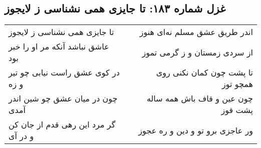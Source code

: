 \begin{center}
\section*{غزل شماره ۱۸۳: تا جایزی همی نشناسی ز لایجوز}
\label{sec:183}
\begin{longtable}{l p{0.5cm} r}
تا جایزی همی نشناسی ز لایجوز
&&
اندر طریق عشق مسلم نه‌ای هنوز
\\
عاشق نباشد آنکه مر او را خبر بود
&&
از سردی زمستان و ز گرمی تموز
\\
در کوی عشق راست نیابی چو تیر و زه
&&
تا پشت چون کمان نکنی روی همچو توز
\\
چون در میان عشق چو شین اندر آمدی
&&
چون عین و قاف باش همه ساله پشت قوز
\\
گر مرد این رهی قدم از جان کن و در آی
&&
ور عاجزی برو تو و دین و ره عجوز
\\
\end{longtable}
\end{center}
